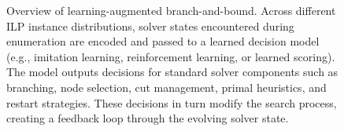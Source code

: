 \begin{figure}[htbp]
{
}

\caption{Overview of learning-augmented branch-and-bound. Across different ILP instance distributions, solver states encountered during enumeration are encoded and passed to a learned decision model (e.g., imitation learning, reinforcement learning, or learned scoring). The model outputs decisions for standard solver components such as branching, node selection, cut management, primal heuristics, and restart strategies. These decisions in turn modify the search process, creating a feedback loop through the evolving solver state.}
\label{fig:problem_agnostic_learning}
\end{figure}
